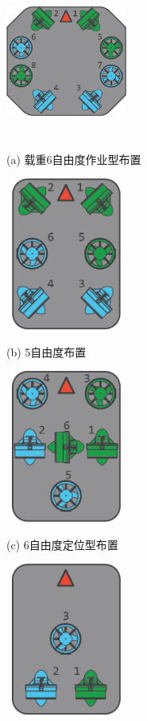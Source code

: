 \begin{figure}
\begin{minipage}{0.48\linewidth}
  \centerline{\includegraphics[width=4.0cm,height = 5cm]{figure/chap2/vectored6dof-frame.png}}
  \centerline{(a) 载重6自由度作业型布置}
\end{minipage}
\hfill
\begin{minipage}{.48\linewidth}
  \centerline{\includegraphics[width=4.0cm,height = 5cm]{figure/chap2/vectored-frame.png}}
  \centerline{(b) 5自由度布置}
\end{minipage}
\vfill
\begin{minipage}{0.48\linewidth}
  \centerline{\includegraphics[width=4.0cm,height = 5cm]{figure/chap2/bluerov-frame.png}}
  \centerline{(c) 6自由度定位型布置}
\end{minipage}
\hfill
\begin{minipage}{0.48\linewidth}
  \centerline{\includegraphics[width=4.0cm,height = 5cm]{figure/chap2/simplerov-3.png}}

\end{minipage}
\end{figure}
